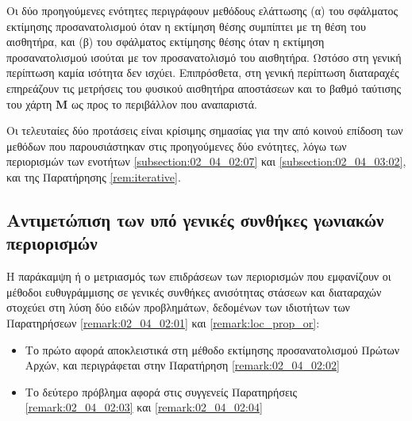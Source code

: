 Οι δύο προηγούμενες ενότητες περιγράφουν μεθόδους ελάττωσης (α) του σφάλματος
εκτίμησης προσανατολισμού όταν η εκτίμηση θέσης συμπίπτει με τη θέση του
αισθητήρα, και (β) του σφάλματος εκτίμησης θέσης όταν η εκτίμηση
προσανατολισμού ισούται με τον προσανατολισμό του αισθητήρα. Ωστόσο στη γενική
περίπτωση καμία ισότητα δεν ισχύει. Επιπρόσθετα, στη γενική περίπτωση
διαταραχές επηρεάζουν τις μετρήσεις του φυσικού αισθητήρα αποστάσεων και το
βαθμό ταύτισης του χάρτη $\bm{M}$ ως προς το περιβάλλον που αναπαριστά.

Οι τελευταίες δύο προτάσεις είναι κρίσιμης σημασίας για την από κοινού επίδοση
των μεθόδων που παρουσιάστηκαν στις προηγούμενες δύο ενότητες, λόγω των
περιορισμών των ενοτήτων \ref{subsection:02_04_02:07} και
\ref{subsection:02_04_03:02}, και της Παρατήρησης \ref{rem:iterative}.

\subsection{Αντιμετώπιση των υπό γενικές συνθήκες γωνιακών περιορισμών}
\label{subsection:02_04_04:01}

Η παράκαμψη ή ο μετριασμός των επιδράσεων των περιορισμών που εμφανίζουν οι
μέθοδοι ευθυγράμμισης σε γενικές συνθήκες ανισότητας στάσεων και διαταραχών
στοχεύει στη λύση δύο ειδών προβλημάτων, δεδομένων των ιδιοτήτων των
Παρατηρήσεων \ref{remark:02_04_02:01} και \ref{remark:loc_prop_or}:

\begin{itemize}
  \item Το πρώτο αφορά αποκλειστικά στη μέθοδο εκτίμησης προσανατολισμού
        Πρώτων Αρχών, και περιγράφεται στην Παρατήρηση \ref{remark:02_04_02:02}
  \item Το δεύτερο πρόβλημα αφορά στις συγγενείς Παρατηρήσεις
        \ref{remark:02_04_02:03} και \ref{remark:02_04_02:04}
\end{itemize}


